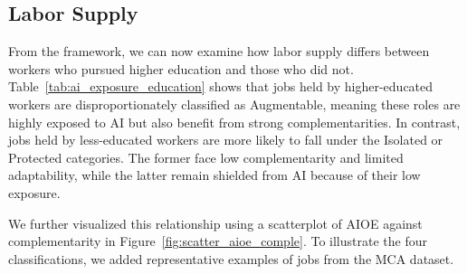 \subsection{Labor Supply}
From the framework, we can now examine how labor supply differs between workers 
who pursued higher education and those who did not. Table~\ref{tab:ai_exposure_education} 
shows that jobs held by higher-educated workers are disproportionately classified as 
Augmentable, meaning these roles are highly exposed to AI but also benefit 
from strong complementarities. In contrast, jobs held by less-educated workers are 
more likely to fall under the Isolated or Protected categories. 
The former face low complementarity and limited adaptability, while the latter 
remain shielded from AI because of their low exposure.

\begin{table}[h!]
\caption{Percentage of jobs by educational pathway and AI classification.}
\label{tab:ai_exposure_education}
\end{table}

We further visualized this relationship using a scatterplot of AIOE against 
complementarity in Figure~\ref{fig:scatter_aioe_comple}. To illustrate the four classifications, we added representative 
examples of jobs from the MCA dataset. 


